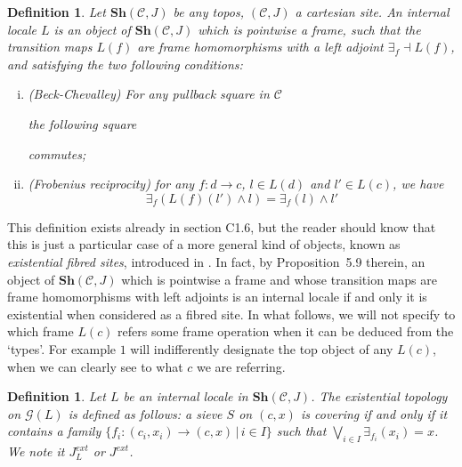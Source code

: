 \documentclass{article}
\newtheorem{definition}[theorem]{Definition}
\begin{document}
\begin{definition}
    Let $\mathbf{Sh}(\mathcal{C},J)$ be any topos, $(\mathcal{C},J)$ a cartesian site. An internal locale $L$ is an object of $\mathbf{Sh}(\mathcal{C},J)$ which is pointwise a frame, such that the transition maps $L(f)$ are frame homomorphisms with a left adjoint $\exists_f\dashv L(f)$, and satisfying the two following conditions:\\
    \begin{enumerate}[(i)]
        \item (Beck-Chevalley) For any pullback square in $\mathcal{C}$
        \begin{center}
    \end{center}
the following square 
\begin{center}
    \end{center}
 commutes;\\
 \item (Frobenius reciprocity) for any $f:d\xrightarrow{}c$, $l\in L(d)$ and $l'\in L(c)$, we have 
$$\exists_f(L(f)(l') \land l) = \exists_f(l) \land l'$$
    \end{enumerate}
\end{definition}

This definition exists already in \cite{johnstone2002sketches} section C1.6, but the reader should know that this is just a particular case of a more general kind of objects, known as \emph{existential fibred sites}, introduced in \cite{caramello2022fibred}. In fact, by Proposition~5.9 therein, an object of $\mathbf{Sh}(\mathcal{C},J)$ which is pointwise a frame and whose transition maps are frame homomorphisms with left adjoints is an internal locale if and only it is existential when considered as a fibred site. In what follows, we will not specify to which frame $L(c)$ refers some frame operation when it can be deduced from the `types'. For example $1$ will indifferently designate the top object of any $L(c)$, when we can clearly see to what $c$ we are referring.

\begin{definition}
    Let $L$ be an internal locale in $\mathbf{Sh}(\mathcal{C},J)$. The existential topology on $\mathcal{G}(L)$ is defined as follows: a sieve $S$ on $(c,x)$ is covering if and only if it contains a family $\{f_i:(c_i,x_i)\xrightarrow{}(c,x)\,|\,i\in I\}$ such that $\bigvee_{i\in I}\exists_{f_i}(x_i)=x$. We note it $J_L^{ext}$ or $J^{ext}$.
\end{definition}
\end{document}
